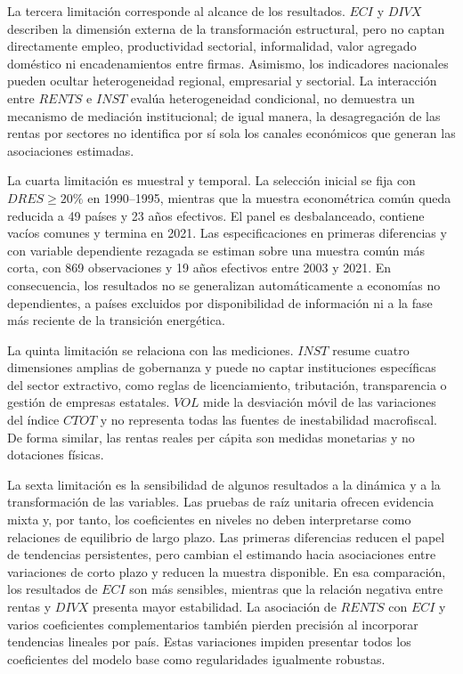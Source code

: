\documentclass[../../TFM.tex]{subfiles}
\begin{document}
La tercera limitación corresponde al alcance de los resultados. $ECI$ y $DIVX$
describen la dimensión externa de la transformación estructural, pero no captan
directamente empleo, productividad sectorial, informalidad, valor agregado
doméstico ni encadenamientos entre firmas. Asimismo, los indicadores nacionales
pueden ocultar heterogeneidad regional, empresarial y sectorial. La interacción
entre $RENTS$ e $INST$ evalúa heterogeneidad condicional, no demuestra un
mecanismo de mediación institucional; de igual manera, la desagregación de las
rentas por sectores no identifica por sí sola los canales económicos que generan
las asociaciones estimadas.

La cuarta limitación es muestral y temporal. La selección inicial se fija con
$DRES\geq20\%$ en 1990--1995, mientras que la muestra econométrica común queda
reducida a 49 países y 23 años efectivos. El panel es desbalanceado, contiene
vacíos comunes y termina en 2021. Las especificaciones en primeras diferencias
y con variable dependiente rezagada se estiman sobre una muestra común más corta,
con 869 observaciones y 19 años efectivos entre 2003 y 2021. En consecuencia,
los resultados no se generalizan automáticamente a economías no dependientes, a
países excluidos por disponibilidad de información ni a la fase más reciente de
la transición energética.

La quinta limitación se relaciona con las mediciones. $INST$ resume cuatro
dimensiones amplias de gobernanza y puede no captar instituciones específicas
del sector extractivo, como reglas de licenciamiento, tributación, transparencia
o gestión de empresas estatales. $VOL$ mide la desviación móvil de las
variaciones del índice $CTOT$ y no representa todas las fuentes de inestabilidad
macrofiscal. De forma similar, las rentas reales per cápita son medidas
monetarias y no dotaciones físicas.

La sexta limitación es la sensibilidad de algunos resultados a la dinámica y a
la transformación de las variables. Las pruebas de raíz unitaria ofrecen
evidencia mixta y, por tanto, los coeficientes en niveles no deben interpretarse
como relaciones de equilibrio de largo plazo. Las primeras diferencias reducen
el papel de tendencias persistentes, pero cambian el estimando hacia asociaciones
entre variaciones de corto plazo y reducen la muestra disponible. En esa
comparación, los resultados de $ECI$ son más sensibles, mientras que la relación
negativa entre rentas y $DIVX$ presenta mayor estabilidad. La asociación de
$RENTS$ con $ECI$ y varios coeficientes complementarios también pierden precisión
al incorporar tendencias lineales por país. Estas variaciones impiden presentar
todos los coeficientes del modelo base como regularidades igualmente robustas.
\end{document}
